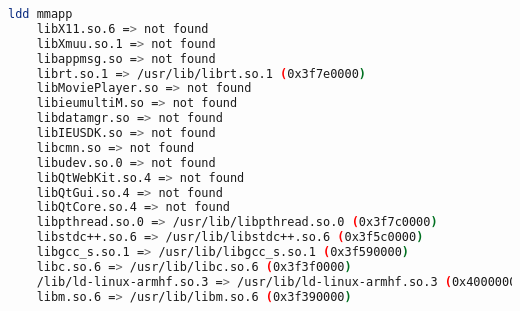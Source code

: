
\begin{lstlisting}[language=bash, caption={Zeigt die Ausgabe des \texttt{ldd} commands auf mmapp.
\texttt{ldd} ist ein Programm zur Ausgabe von benötigten Bibliotheken eines Binarys.},label={lst:ldd-mmapp}]
ldd mmapp
	libX11.so.6 => not found
	libXmuu.so.1 => not found
	libappmsg.so => not found
	librt.so.1 => /usr/lib/librt.so.1 (0x3f7e0000)
	libMoviePlayer.so => not found
	libieumultiM.so => not found
	libdatamgr.so => not found
	libIEUSDK.so => not found
	libcmn.so => not found
	libudev.so.0 => not found
	libQtWebKit.so.4 => not found
	libQtGui.so.4 => not found
	libQtCore.so.4 => not found
	libpthread.so.0 => /usr/lib/libpthread.so.0 (0x3f7c0000)
	libstdc++.so.6 => /usr/lib/libstdc++.so.6 (0x3f5c0000)
	libgcc_s.so.1 => /usr/lib/libgcc_s.so.1 (0x3f590000)
	libc.so.6 => /usr/lib/libc.so.6 (0x3f3f0000)
	/lib/ld-linux-armhf.so.3 => /usr/lib/ld-linux-armhf.so.3 (0x40000000)
	libm.so.6 => /usr/lib/libm.so.6 (0x3f390000)
\end{lstlisting}
